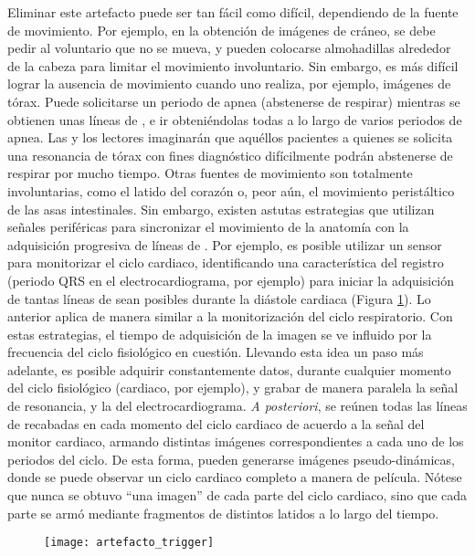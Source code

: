 Eliminar este artefacto puede ser tan fácil como difícil, dependiendo de la fuente de movimiento. Por ejemplo, en la obtención de imágenes de cráneo, se debe pedir al voluntario que no se mueva, y pueden colocarse almohadillas alrededor de la cabeza para limitar el movimiento involuntario. Sin embargo, es más difícil lograr la ausencia de movimiento cuando uno realiza, por ejemplo, imágenes de tórax. Puede solicitarse un periodo de apnea (abstenerse de respirar) mientras se obtienen unas líneas de \espaciok, e ir obteniéndolas todas a lo largo de varios periodos de apnea. Las y los lectores imaginarán que aquéllos pacientes a quienes se solicita una resonancia de tórax con fines diagnóstico difícilmente podrán abstenerse de respirar por mucho tiempo. Otras fuentes de movimiento son totalmente involuntarias, como el latido del corazón o, peor aún, el movimiento peristáltico de las asas intestinales. Sin embargo, existen astutas estrategias que utilizan señales periféricas para sincronizar el movimiento de la anatomía con la adquisición progresiva de líneas de \espaciok. Por ejemplo, es posible utilizar un sensor para monitorizar el ciclo  cardiaco, identificando una característica del registro (periodo QRS en el electrocardiograma, por ejemplo) para iniciar la adquisición de tantas líneas de \espaciok sean posibles durante la diástole cardiaca (Figura \ref{fig:artefacto_trigger}). Lo anterior aplica de manera similar a la monitorización del ciclo respiratorio. Con estas estrategias, el tiempo de adquisición de la imagen se ve influido por la frecuencia del ciclo fisiológico en cuestión. Llevando esta idea un paso más adelante, es posible adquirir constantemente datos, durante cualquier momento del ciclo fisiológico (cardiaco, por ejemplo), y grabar de manera paralela la señal de resonancia, y la del electrocardiograma. \textit{A posteriori}, se reúnen todas las líneas de \espaciok recabadas en cada momento del ciclo cardiaco de acuerdo a la señal del monitor cardiaco, armando distintas imágenes correspondientes a cada uno de los periodos del ciclo. De esta forma, pueden generarse imágenes pseudo-dinámicas, donde se puede observar un ciclo cardiaco completo a manera de película. Nótese que nunca se obtuvo ``una imagen'' de cada parte del ciclo cardiaco, sino que cada parte se armó mediante fragmentos de distintos latidos a lo largo del tiempo.



 \begin{figure}[htb]
 \begin{figg}
   \texttt{[image: artefacto\_trigger]}
   \caption{\figurapendiente}
 \label{fig:artefacto_trigger}
 \end{figg}
\end{figure}
 

